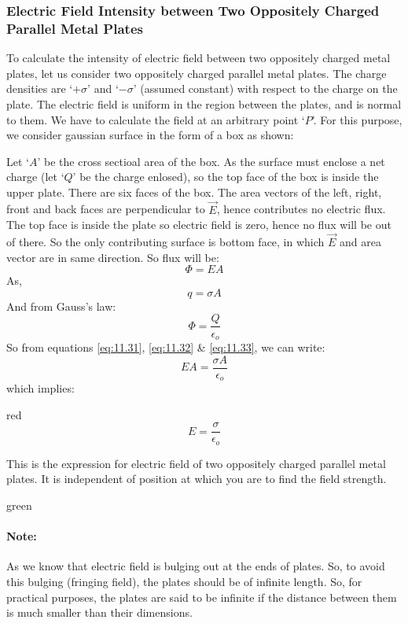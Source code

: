 \subsubsection{Electric Field Intensity between Two Oppositely Charged Parallel Metal Plates}
To calculate the intensity of electric field between two oppositely
charged metal plates, let us consider two oppositely charged parallel
metal plates. The charge densities are `$+\sigma$’ and `$-\sigma$’ (assumed constant)
with respect to the charge on the plate. The electric field is uniform
in the region between the plates, and is normal to them.
We have to calculate the field at an arbitrary point `$P$'.
For this purpose, we consider gaussian surface in the form of a box
as shown:

Let `$A$' be the cross sectioal area of the box. As the surface
must enclose a net charge (let `$Q$' be the charge enlosed),
so the top face of the box is inside the upper plate.
There are six faces of the box. The area vectors of the left, right,
front and back faces are perpendicular to $\vec{E}$, hence contributes
no electric flux. The top face is inside the plate so electric field is
zero, hence no flux will be out of there. So the only contributing surface
is bottom face, in which $\vec{E}$ and area vector are in same direction.
So flux will be:
\begin{equation}\label{eq:11.31}
  \Phi = EA 
\end{equation}
As, 
\begin{equation}\label{eq:11.32}
  q = \sigma A
\end{equation}
And from Gauss’s law:
\begin{equation}\label{eq:11.33}
  \Phi = \frac{Q}{\epsilon_{o}}
\end{equation}
So from equations \ref{eq:11.31}, \ref{eq:11.32} \& \ref{eq:11.33}, we can
write:
\begin{equation}
  EA = \frac{\sigma A}{\epsilon_{o}} \nonumber
\end{equation}
which implies:
\begin{mybox}{red}{}
\begin{equation}\label{eq:11.34}
  E = \frac{\sigma}{\epsilon_{o}}
\end{equation}
\end{mybox}
\noindent This is the expression for electric field of two oppositely charged
parallel metal plates. It is independent of position at which you
are to find the field strength.
\begin{mybox}{green}{}
\paragraph*{\note{}Note:}
As we know that electric field is bulging out at the ends of plates.
So, to avoid this bulging (fringing field),
the plates should be of infinite length. So, for practical purposes,
the plates are said to be infinite if the distance between them is
much smaller than their dimensions. 
\end{mybox}
